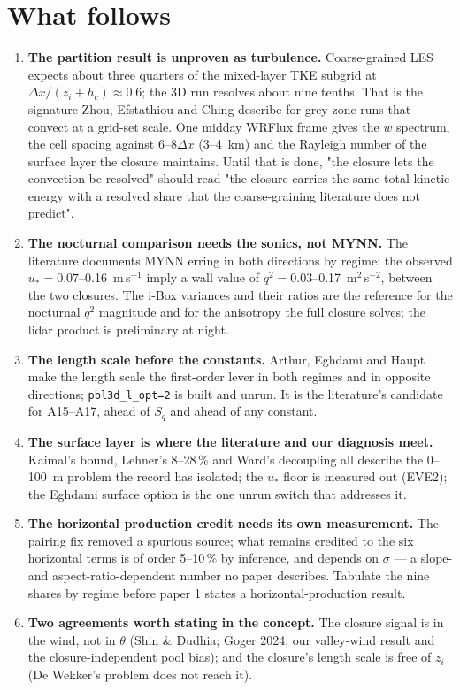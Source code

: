 \documentclass[10pt,a4paper]{article}
\newcommand{\dx}{\Delta x}
\newcommand{\qsq}{q^2}
\begin{document}
\section*{What follows}
\begin{enumerate}[itemsep=2pt]
\item \textbf{The partition result is unproven as turbulence.} Coarse-grained LES expects about three quarters of the mixed-layer TKE subgrid at $\dx/(z_i + h_c) \approx 0.6$; the 3D run resolves about nine tenths. That is the signature Zhou, Efstathiou and Ching describe for grey-zone runs that convect at a grid-set scale. One midday WRFlux frame gives the $w$ spectrum, the cell spacing against 6--8$\dx$ (3--4~km) and the Rayleigh number of the surface layer the closure maintains. Until that is done, "the closure lets the convection be resolved" should read "the closure carries the same total kinetic energy with a resolved share that the coarse-graining literature does not predict".
\item \textbf{The nocturnal comparison needs the sonics, not MYNN.} The literature documents MYNN erring in both directions by regime; the observed $u_* = 0.07$--0.16~m\,s$^{-1}$ imply a wall value of $\qsq = 0.03$--0.17~m$^2$\,s$^{-2}$, between the two closures. The i-Box variances and their ratios are the reference for the nocturnal $\qsq$ magnitude and for the anisotropy the full closure solves; the lidar product is preliminary at night.
\item \textbf{The length scale before the constants.} Arthur, Eghdami and Haupt make the length scale the first-order lever in both regimes and in opposite directions; \texttt{pbl3d\_l\_opt=2} is built and unrun. It is the literature's candidate for A15--A17, ahead of $S_q$ and ahead of any constant.
\item \textbf{The surface layer is where the literature and our diagnosis meet.} Kaimal's bound, Lehner's 8--28\,\% and Ward's decoupling all describe the 0--100~m problem the record has isolated; the $u_*$ floor is measured out (EVE2); the Eghdami surface option is the one unrun switch that addresses it.
\item \textbf{The horizontal production credit needs its own measurement.} The pairing fix removed a spurious source; what remains credited to the six horizontal terms is of order 5--10\,\% by inference, and depends on $\sigma$ --- a slope- and aspect-ratio-dependent number no paper describes. Tabulate the nine shares by regime before paper 1 states a horizontal-production result.
\item \textbf{Two agreements worth stating in the concept.} The closure signal is in the wind, not in $\theta$ (Shin \& Dudhia; Goger 2024; our valley-wind result and the closure-independent pool bias); and the closure's length scale is free of $z_i$ (De Wekker's problem does not reach it).
\end{enumerate}

{\footnotesize\printbibliography[title=References]}
\end{document}
